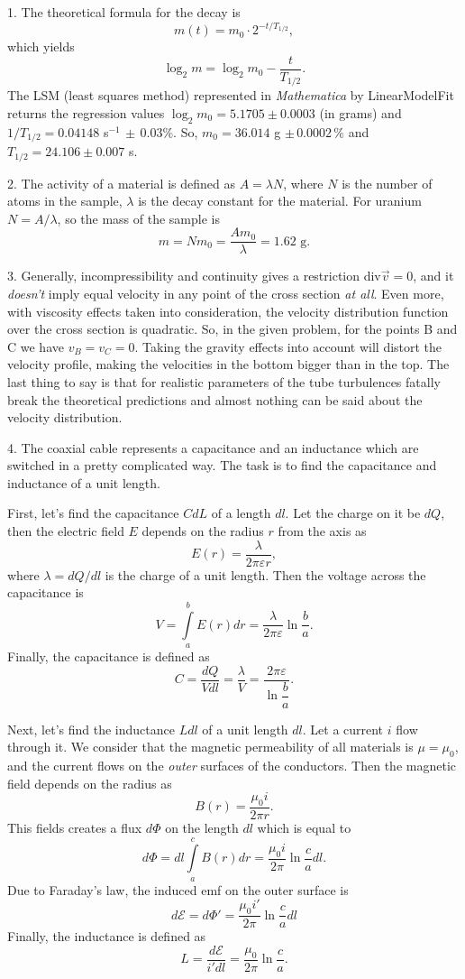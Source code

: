 \documentclass[12pt,a4paper,pdflatex]{disser}
\begin{document}
1. The theoretical formula for the decay is
$$
  m(t)=m_0 \cdot 2^{-t/T_{1/2}},
$$
which yields
$$
  \log_2 m=\log_2 m_0-\frac{t}{T_{1/2}}.
$$
The LSM (least squares method) represented in \textit{Mathematica} by LinearModelFit returns the regression values $\log_2 m_0=5.1705 \pm 0.0003$ (in grams) and $1/T_{1/2}=0.04148$ s$^{-1}\,\pm\,0.03\%$. So, $m_0=36.014$ g $\pm\,0.0002\,\%$ and $T_{1/2}=24.106\pm 0.007$ s.

2. The activity of a material is defined as $A=\lambda N$, where $N$ is the number of atoms in the sample, $\lambda$ is the decay constant for the material. For uranium $N=A/\lambda$, so the mass of the sample is
$$
  m=Nm_0=\frac{Am_0}{\lambda}=1.62 \text{ g}.
$$

3. Generally, incompressibility and continuity gives a restriction div$\overrightarrow{v}=0$, and it \textit{doesn't} imply equal velocity in any point of the cross section \textit{at all}. Even more, with viscosity effects taken into consideration, the velocity distribution function over the cross section is quadratic. So, in the given problem, for the points B and C we have $v_B=v_C=0$. Taking the gravity effects into account will distort the velocity profile, making the velocities in the bottom bigger than in the top. The last thing to say is that for realistic parameters of the tube turbulences fatally break the theoretical predictions and almost nothing can be said about the velocity distribution.

4. The coaxial cable represents a capacitance and an inductance which are switched in a pretty complicated way. The task is to find the capacitance and inductance of a unit length.

First, let's find the capacitance $CdL$ of a length $dl$. Let the charge on it be $dQ$, then the electric field $E$ depends on the radius $r$ from the axis as
$$
  E(r)=\frac{\lambda}{2\pi \varepsilon r},
$$
where $\lambda=dQ/dl$ is the charge of a unit length. Then the voltage across the capacitance is
$$
  V=\int\limits_a^b E(r)dr=\frac{\lambda}{2\pi \varepsilon}\ln\frac{b}{a}.
$$
Finally, the capacitance is defined as
$$
  C=\frac{dQ}{Vdl}=\frac{\lambda}{V}=\frac{2\pi \varepsilon}{\ln\dfrac{b}{a}}.
$$

Next, let's find the inductance $Ldl$ of a unit length $dl$. Let a current $i$ flow through it. We consider that the magnetic permeability of all materials is $\mu=\mu_0$, and the current flows on the \textit{outer} surfaces of the conductors. Then the magnetic field depends on the radius as
$$
  B(r)=\frac{\mu_0 i}{2\pi r}.
$$
This fields creates a flux $d\Phi$ on the length $dl$ which is equal to
$$
  d\Phi=dl\int\limits_a^c B(r)dr=\frac{\mu_0 i}{2\pi}\ln\frac{c}{a}dl.
$$
Due to Faraday's law, the induced emf on the outer surface is
$$
  d\mathcal{E}=d\Phi'=\frac{\mu_0 i'}{2\pi}\ln\frac{c}{a}dl
$$
Finally, the inductance is defined as
$$
  L=\frac{d\mathcal{E}}{i' dl}=\frac{\mu_0}{2\pi}\ln\frac{c}{a}.
$$
\end{document}
